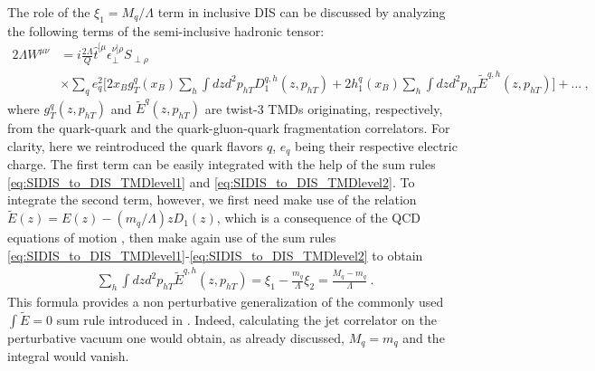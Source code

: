 \documentclass[preprintnumbers,floatfix,nofootinbib]{revtex4}
\newcommand{\xbj}{{x_B}}                   %
\newcommand{\mj}{M_q}
\newcommand{\mq}{m_q}
\begin{document}
The role of the $\xi_1=M_q/\Lambda$ term in inclusive DIS can be discussed by analyzing the following terms of the semi-inclusive hadronic tensor:
\begin{align}
  \label{eq:Wsidis_ini}
  2 \Lambda  W^{\mu\nu}
    & = i \frac{2\Lambda}{Q} \hat t^{[\mu}_{\phantom \perp} 
    \epsilon_\perp^{\nu]\rho}S_{\perp\rho} \\
    & \times \sum_q e_q^2
    \bigg[ 2 \xbj g_T^q(\xbj) \sum_h \int dz d^2p_{hT} D_1^{q,h}(z,p_{hT}) 
  + 2 h_1^q(\xbj) \sum_h \int dz d^2p_{hT} \tilde E^{q,h}(z,p_{hT}) \bigg] + \ldots \ , \nonumber
\end{align}
where $g_T^q(z,p_{hT})$ and $\tilde E^q(z,p_{hT})$ are twist-3 TMDs originating, respectively, from the quark-quark and the quark-gluon-quark fragmentation correlators. 
For clarity, here we reintroduced the quark flavors $q$, $e_q$ being their respective electric charge.
The first term can be easily integrated with the help of the sum rules
\eqref{eq:SIDIS_to_DIS_TMDlevel1} and \eqref{eq:SIDIS_to_DIS_TMDlevel2}. To integrate the second term, however, we first need make
use of the relation $\tilde E(z) = E(z) - (\mq/\Lambda) z D_1(z)$, which is a
consequence of the QCD equations of motion \cite{Bacchetta:2006tn}, then
make again use of the sum rules \eqref{eq:SIDIS_to_DIS_TMDlevel1}-\eqref{eq:SIDIS_to_DIS_TMDlevel2} to obtain
\begin{align}
  \sum_h \int dz d^2p_{hT} \tilde E^{q,h}(z,p_{hT}) 
    = \xi_1 - \frac{\mq}{\Lambda} \xi_2 = \frac{\mj - \mq}{\Lambda }\ .
\end{align}
This formula provides a
non perturbative generalization of the commonly used $\int\tilde E =0$ sum
rule introduced in \cite{Jaffe:1996zw}. Indeed, calculating the jet correlator 
on the perturbative vacuum one would obtain, as already discussed, $\mj=\mq$
and the integral would vanish.
\end{document}
